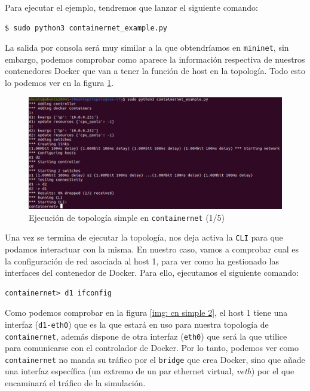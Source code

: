 \documentclass[a4paper, oneside, 12pt]{book}
\begin{document}
	\noindent Para ejecutar el ejemplo, tendremos que lanzar el siguiente comando:
	\begin{verbatim}
$ sudo python3 containernet_example.py
	\end{verbatim}

	\noindent La salida por consola será muy similar a la que obtendríamos en \texttt{mininet}, sin embargo, podemos comprobar como aparece la información respectiva de nuestros contenedores Docker que van a tener la función de host en la topología. Todo esto lo podemos ver en la figura \ref{img: cn simple 1}.
	
	\begin{figure}[h!]
		\begin{center}
			\includegraphics[width=1\textwidth]{img/cn_example1.png}
			\caption{Ejecución de topología simple en \texttt{containernet} (1/5)}
			\label{img: cn simple 1}
		\end{center}
	\end{figure}

	\noindent Una vez se termina de ejecutar la topología, nos deja activa la \texttt{CLI} para que podamos interactuar con la misma. En nuestro caso, vamos a comprobar cual es la configuración de red asociada al host 1, para ver como ha gestionado las interfaces del contenedor de Docker. Para ello, ejecutamos el siguiente comando:
	\begin{verbatim}
containernet> d1 ifconfig
	\end{verbatim}

	\noindent Como podemos comprobar en la figura \ref{img: cn simple 2}, el host 1 tiene una interfaz (\texttt{d1-eth0}) que es la que estará en uso para nuestra topología de \texttt{containernet}, además dispone de otra interfaz (\texttt{eth0}) que será la que utilice para comunicarse con el controlador de Docker. Por lo tanto, podemos ver como \texttt{containernet} no manda su tráfico por el \texttt{bridge} que crea Docker, sino que añade una interfaz específica (un extremo de un par ethernet virtual, \textit{veth}) por el que encaminará el tráfico de la simulación.
\end{document}
